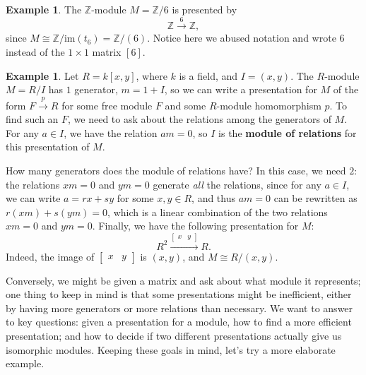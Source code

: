 \documentclass[12pt]{report}
\numberwithin{equation}{section}
\numberwithin{theorem}{chapter}
\theoremstyle{definition}
\newtheorem{example}[theorem]{Example}
\newtheorem*{basic properties}{Basic Properties}
\newtheorem*{Important Remark}{Important Remark}
\newcommand{\df}[1]{{\bf #1}\index{#1}}
\begin{document}
 
\begin{example}
	The $\mathbb{Z}$-module $M = \mathbb{Z}/6$ is presented by 
	$$\mathbb{Z} \xrightarrow{6} \mathbb{Z},$$
	since $M \cong \mathbb{Z}/ \mathrm{im}(t_6) = \mathbb{Z}/(6)$. Notice here we abused notation and wrote $6$ instead of the $1 \times 1$ matrix $\left[ 6 \right]$.
\end{example}

\begin{example}
	Let $R = k[x,y]$, where $k$ is a field, and $I = (x,y)$. The $R$-module $M = R/I$ has $1$ generator, $m = 1+I$, so we can write a presentation for $M$ of the form $F \xrightarrow{p} R$ for some free module $F$ and some $R$-module homomorphism $p$. To find such an $F$, we need to ask about the relations among the generators of $M$. For any $a \in I$, we have the relation $am = 0$, so $I$ is the \df{module of relations} for this presentation of $M$. 
	
	How many generators does the module of relations have? In this case, we need $2$: the relations $xm = 0$ and $ym=0$ generate \emph{all} the relations, since for any $a \in I$, we can write $a = rx+sy$ for some $x, y \in R$, and thus $am = 0$ can be rewritten as $r(xm) + s(ym) = 0$, which is a linear combination of the two relations $xm=0$ and $ym=0$. Finally, we have the following presentation for $M$:
	$$R^2 \xrightarrow{\begin{bmatrix} x & y \end{bmatrix}} R.$$
	Indeed, the image of $\begin{bmatrix} x & y \end{bmatrix}$ is $(x,y)$, and $M \cong R/(x,y)$.
\end{example}


Conversely, we might be given a matrix and ask about what module it represents; one thing to keep in mind is that some presentations might be inefficient, either by having more generators or more relations than necessary. We want to answer to key questions: given a presentation for a module, how to find a more efficient presentation; and how to decide if two different presentations actually give us isomorphic modules. Keeping these goals in mind, let's try a more elaborate example.
 
\end{document}
